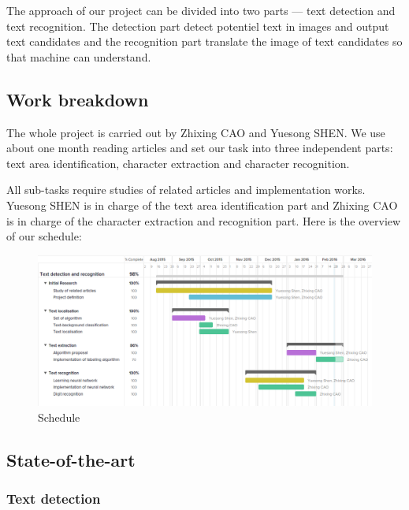 \documentclass[paper=a4, french, 11pt]{scrartcl}
\begin{document}
The approach of our project can be divided into two parts --- text detection and text recognition. The detection part detect potentiel text in images and output text candidates and the recognition part translate the image of text candidates so that machine can understand.

\subsection{Work breakdown} \mbox{} \vspace{-0.5cm}

The whole project is carried out by Zhixing CAO and Yuesong SHEN. We use about one month reading articles and set our task into three independent parts: text area identification, character extraction and character recognition.

All sub-tasks require studies of related articles and implementation works. Yuesong SHEN is in charge of the text area identification part and Zhixing CAO is in charge of the character extraction and recognition part. Here is the overview of our schedule:

\begin{figure}[h]
\begin{center}
   \includegraphics[width=0.95\linewidth]{breakdowns.png}
\end{center}
\caption{Schedule}
\label{fig:schedule}
\end{figure}

\subsection{State-of-the-art} \mbox{} \vspace{-0.5cm}

\subsubsection{Text detection} \mbox{} \vspace{-0.5cm}
\end{document}
